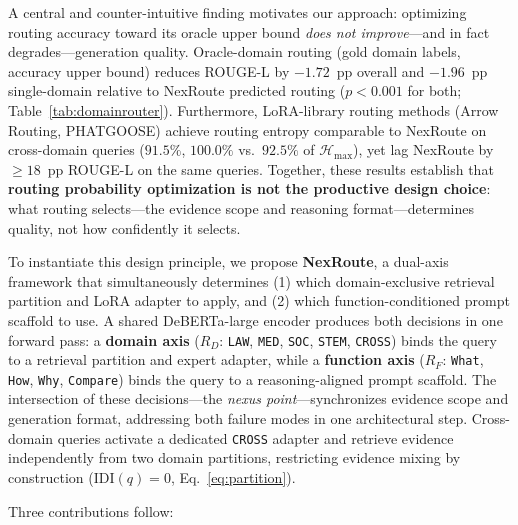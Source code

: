 A central and counter-intuitive finding motivates our approach:
optimizing routing accuracy toward its oracle upper bound \emph{does not improve}---and
in fact degrades---generation quality.
Oracle-domain routing (gold domain labels, accuracy upper bound) reduces ROUGE-L
by $-1.72$~pp overall and $-1.96$~pp single-domain relative to NexRoute predicted routing
($p{<}0.001$ for both; Table~\ref{tab:domainrouter}).
Furthermore, LoRA-library routing methods (Arrow Routing, PHATGOOSE) achieve routing
entropy comparable to NexRoute on cross-domain queries ($91.5\%$, $100.0\%$ vs.\
$92.5\%$ of $\mathcal{H}_{\max}$), yet lag NexRoute by ${\geq}18$~pp ROUGE-L on the same queries.
Together, these results establish that \textbf{routing probability optimization is not
the productive design choice}: what routing selects---the evidence scope and reasoning
format---determines quality, not how confidently it selects.

To instantiate this design principle, we propose \textbf{NexRoute}, a dual-axis
framework that simultaneously determines (1) which domain-exclusive retrieval
partition and LoRA adapter to apply, and (2) which function-conditioned prompt
scaffold to use.
A shared DeBERTa-large encoder produces both decisions in one forward pass:
a \textbf{domain axis} ($R_D$: \texttt{LAW}, \texttt{MED}, \texttt{SOC},
\texttt{STEM}, \texttt{CROSS}) binds the query to a retrieval partition and expert
adapter, while a \textbf{function axis} ($R_F$: \texttt{What}, \texttt{How},
\texttt{Why}, \texttt{Compare}) binds the query to a reasoning-aligned prompt scaffold.
The intersection of these decisions---the \textit{nexus point}---synchronizes evidence
scope and generation format, addressing both failure modes in one architectural step.
Cross-domain queries activate a dedicated \texttt{CROSS} adapter and retrieve
evidence independently from two domain partitions, restricting evidence mixing by
construction ($\mathrm{IDI}(q){=}0$, Eq.~\ref{eq:partition}).

Three contributions follow:


